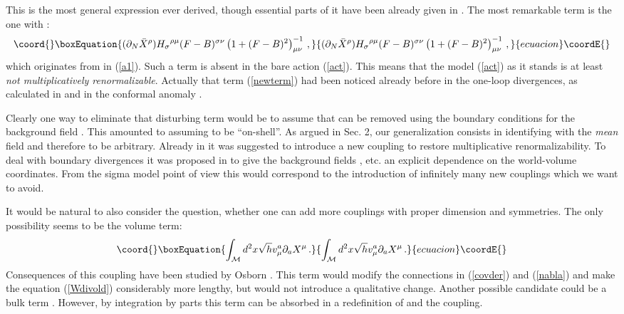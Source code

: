 \documentclass[a4paper,12pt]{article}
\begin{document}
This is the most general expression ever derived, though 
 essential parts of it have been
already given in \cite{dornotto86,Callan88,Osborn91}.
The most remarkable term is the one with  \coordHE{}:
\begin{equation}\coord{}\boxEquation{
(\partial_N \bar X^\rho )
{H_\sigma}^{\rho\mu} (F-B)^{\sigma\nu} 
\left( 1+(F-B)^2 \right)^{-1}_{\mu\nu} \,, \label{newterm}
}{
(\partial_N \bar X^\rho )
{H_\sigma}^{\rho\mu} (F-B)^{\sigma\nu} 
\left( 1+(F-B)^2 \right)^{-1}_{\mu\nu} \,, }{ecuacion}\coordE{}\end{equation}
which originates from \coordHE{} in (\ref{a1}).
Such a term is  absent in the bare action (\ref{act}).
This means that the model (\ref{act}) as it stands is at 
least {\it not multiplicatively  renormalizable}. Actually 
that term (\ref{newterm}) had been noticed already before in the one-loop
divergences, as calculated  in \cite{dornotto86,Callan88} and in the
conformal anomaly \cite{Osborn91}.

Clearly one way to eliminate that disturbing term would be 
to assume that \coordHE{} can be removed using the 
boundary conditions for the background field \cite{Callan88}. 
This amounted to assuming \coordHE{} to be ``on-shell''.
As argued in Sec. 2, our generalization consists in identifying
\coordHE{} with the {\it mean} field and 
therefore to be arbitrary. Already in \cite{dornotto86} it was suggested 
to introduce a 
new coupling to restore multiplicative renormalizability. 
To deal with boundary divergences it was proposed in \cite{behrndtdorn92}
to give the background fields \coordHE{}, etc.
an explicit dependence on the world-volume coordinates.
{}From the sigma model point of view this would correspond to
the introduction of infinitely many new couplings which we
want to avoid.

It would be natural to also consider the question, 
 whether one can add more couplings
with proper dimension and symmetries. The only possibility
seems to be the volume term:
\begin{equation}\coord{}\boxEquation{
\int_{\cal M} d^2 x\sqrt{h} v_\mu^a \partial_a X^\mu \,.
\label{osbcoupl}
}{
\int_{\cal M} d^2 x\sqrt{h} v_\mu^a \partial_a X^\mu \,.
}{ecuacion}\coordE{}\end{equation}
Consequences of this coupling have been studied by Osborn
\cite{Osborn91}. This term would modify the connections
in (\ref{covder}) and (\ref{nabla}) and make the
equation (\ref{Wdivold}) considerably more lengthy,
but would not introduce a qualitative 
change. Another
possible candidate could be a bulk term \coordHE{}.
However, by integration by parts this term can be absorbed in
a redefinition of \coordHE{} and the \coordHE{} coupling.
\end{document}

